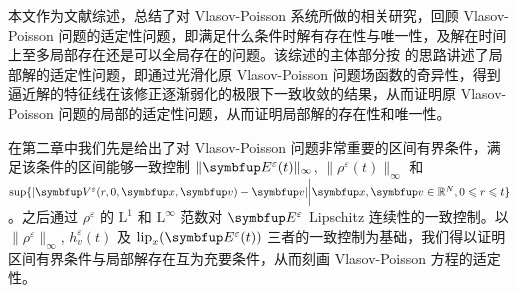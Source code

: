 \begin{cabstract}
  本文作为文献综述，总结了对 Vlasov-Poisson 系统所做的相关研究，回顾 Vlasov-Poisson 问题的适定性问题，即满足什么条件时解有存在性与唯一性，及解在时间上至多局部存在还是可以全局存在的问题。该综述的主体部分按 \cite{HorstClasssicalI} 的思路讲述了局部解的适定性问题，即通过光滑化原 Vlasov-Poisson 问题场函数的奇异性，得到逼近解的特征线在该修正逐渐弱化的极限下一致收敛的结果，从而证明原 Vlasov-Poisson 问题的局部的适定性问题，从而证明局部解的存在性和唯一性。

  在第二章中我们先是给出了对 Vlasov-Poisson 问题非常重要的区间有界条件，满足该条件的区间能够一致控制 $\|\vE^\varepsilon(t)\|_\infty$, $\|\rho^\varepsilon(t)\|_\infty$ 和 $\sup \{|\vect{V}^\varepsilon(r,0,\vx,\vv)-\vv| \bigg|\vx,\vv \in \bbR^N, 0\leqslant r \leqslant t \}$。之后通过 $\rho^\varepsilon$ 的 $\mathrm{L}^1$ 和 $\mathrm{L}^\infty$ 范数对 $\vE^\varepsilon$ Lipschitz 连续性的一致控制。以 $\|\rho^\varepsilon\|_\infty$, $h_v^\varepsilon(t)$ 及 $\operatorname{lip}_x (\vE^\varepsilon(t))$ 三者的一致控制为基础，我们得以证明区间有界条件与局部解存在互为充要条件，从而刻画 Vlasov-Poisson 方程的适定性。
  
  
  
\end{cabstract}


